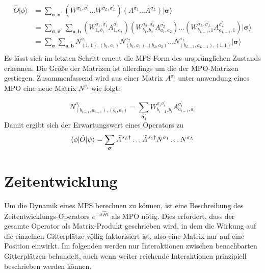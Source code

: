 \documentclass[10pt,a4paper]{report}
\begin{document}
\begin{equation}\label{MPO_MPS_equ}
\begin{split}
\hat{O}|\phi\rangle & = \sum_{\bm{\sigma},\bm{\sigma^\prime}}(W^{\sigma_1,\sigma_1^\prime}\ldots W^{\sigma_L,\sigma_L^\prime})(A^{\sigma_1}\ldots A^{\sigma_L})|\bm{\sigma}\rangle \\
& =\sum_{\bm{\sigma},\bm{\sigma^\prime}}\sum_{\bm{a},\bm{b}}(W_{1,b_1}^{\sigma_1,\sigma_1^\prime}A_{1,a_1}^{\sigma_1^\prime})(W_{b_1,b_2}^{\sigma_2,\sigma_2^\prime}A_{a_1,a_2}^{\sigma_2^\prime})\ldots(W_{b_{L-1},1}^{\sigma_L,\sigma_L^\prime}A_{a_{L-1},1}^{\sigma_L^\prime})|\bm{\sigma}\rangle \\
&=\sum_{\bm{\sigma}}\sum_{\bm{a},\bm{b}}N_{(1,1),(b_1,a_1)}^{\sigma_1}N_{(b_1,a_1),(b_2,a_2)}^{\sigma_2}\ldots N_{(b_{L-1},a_{L-1}),(1,1)}^{\sigma_L}|\bm{\sigma}\rangle \\
\end{split}
\end{equation}
Es lässt sich im letzten Schritt erneut die MPS-Form des ursprünglichen Zustands erkennen. Die Größe der Matrizen ist allerdings um die der MPO-Matrizen gestiegen. Zusammenfassend wird aus einer Matrix $A^{\sigma_i}$ unter anwendung eines MPO eine neue Matrix $N^{\sigma_i}$ wie folgt:

\begin{equation}
N_{(b_{i-1},a_{i-1}),(b_i,a_i)}^{\sigma_i}=\sum_{\bm{\sigma_i^\prime}}W_{b_{i-1},b_i}^{\sigma_i\sigma_i^\prime}A_{a_{i-1},a_i}^{\sigma_i^\prime}
\end{equation}
Damit ergibt sich der Erwartungswert eines Operators zu
\begin{equation}
\langle\phi|\hat{O}|\psi\rangle=\sum_{\bm{\sigma}}\tilde{A}^{\sigma_L \dagger}\ldots\tilde{A}^{\sigma_1 \dagger} N^{\sigma_1}\ldots N^{\sigma_L}\\
\end{equation}

\section{Zeitentwicklung}\label{tMPS}

Um die Dynamik eines MPS berechnen zu können, ist eine Beschreibung des Zeitentwicklungs-Operators $e^{-it\hat{H}t}$ als MPO nötig. Dies erfordert, dass der gesamte Operator als Matrix-Produkt geschrieben wird, in dem die Wirkung auf die einzelnen Gitterplätze völlig faktorisiert ist, also eine Matrix nur auf eine Position einwirkt. Im folgenden werden nur Interaktionen zwischen benachbarten Gitterplätzen behandelt, auch wenn weiter reichende Interaktionen prinzipiell beschrieben werden können.
\end{document}
